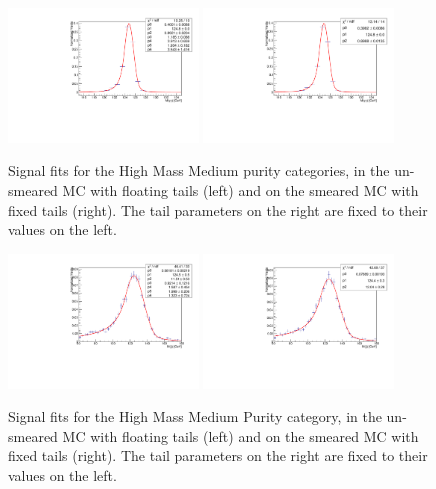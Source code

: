  
\begin{figure}[h]
  \centering
  \includegraphics[width=0.45\textwidth]{figures/sec-systematics/mggHMMPC_floating_central.pdf}\hfil
  \includegraphics[width=0.45\textwidth]{figures/sec-systematics/mggHMMPC_fixed_up.pdf}\hfil
  \caption{Signal fits for the High Mass Medium purity categories, in the un-smeared MC with floating tails (left) and on the smeared MC with fixed tails (right). The tail parameters on the right are fixed to their values on the left.}
  \label{fig:mgg_smear}
\end{figure}

\begin{figure}[h]
  \centering
  \includegraphics[width=0.45\textwidth]{figures/sec-systematics/mjjHMMPC_floating_central.pdf}\hfil
  \includegraphics[width=0.45\textwidth]{figures/sec-systematics/mjjHMMPC_fixed_up.pdf}\hfil
  \caption{Signal fits for the High Mass Medium Purity category, in the un-smeared MC with floating tails (left) and on the smeared MC with fixed tails (right). The tail parameters on the right are fixed to their values on the left.}
  \label{fig:mjj_smear}
\end{figure}

